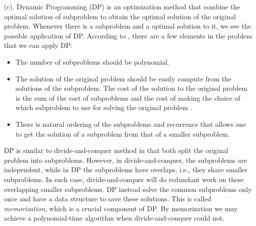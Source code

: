 \documentclass[12pt]{article}
\begin{document}
(c). Dynamic Programming (DP)
\citep{kleinberg2006algorithm,cormen2001introduction} is an optimization method
that combine the optimal solution of subproblem to obtain the optimal solution
of the original problem. Whenever there is a subproblem and a optimal solution
to it, we see the possible application of DP. According to
\citep{kleinberg2006algorithm}, there are a few elements in the problem that we
can apply DP:
\begin{itemize}
\item The number of subproblems should be polynomial.
\item The solution of the original problem should be easily compute from the
  solutions of the subproblem. The cost of the solution to the original problem
  is the sum of the cost of subproblems and the cost of making the choice of
  which subproblem to use for solving the original problem
  \citep{cormen2001introduction}.
\item There is natural ordering of the subproblems and recurrence that allows
  one to get the solution of a subproblem from that of a smaller subproblem.
\end{itemize}

DP is similar to divide-and-conquer method in that both split the original
problem into subproblems. However, in divide-and-conquer, the subproblems are
independent, while in DP the subproblems have overlaps, i.e., they share smaller
subproblems. In such case, divide-and-conquer will do redundant work on these
overlapping smaller subproblems. DP instead solve the common subproblems only
once and have a data structure to save these solutions. This is called
\emph{memorization}, which is a crucial component of DP. By memorization we may
achieve a polynomial-time algorithm when divide-and-conquer could not.
\end{document}
